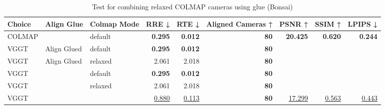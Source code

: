 \begin{table}[H]
\caption{Test for combining relaxed COLMAP cameras using glue (Bonsai)}
\label{tab:99_align_glue_relaxed_bonsai}
\begin{tabular}{lllrrrrrr}
\toprule
Choice & Align Glue & Colmap Mode & RRE ↓ & RTE ↓ & Aligned Cameras ↑ & PSNR ↑ & SSIM ↑ & LPIPS ↓ \\
\midrule
COLMAP &  & default & \textbf{0.295} & \textbf{0.012} & \textbf{80} & \textbf{20.425} & \textbf{0.620} & \textbf{0.244} \\
VGGT & Align Glued & default & \textbf{0.295} & \textbf{0.012} & \textbf{80} &  &  &  \\
VGGT & Align Glued & relaxed & 2.061 & 2.018 & \textbf{80} &  &  &  \\
VGGT &  & default & \textbf{0.295} & \textbf{0.012} & \textbf{80} &  &  &  \\
VGGT &  & relaxed & 2.061 & 2.018 & \textbf{80} &  &  &  \\
VGGT &  &  & \underline{0.880} & \underline{0.113} & \textbf{80} & \underline{17.299} & \underline{0.563} & \underline{0.443} \\
\bottomrule
\end{tabular}
\end{table}
